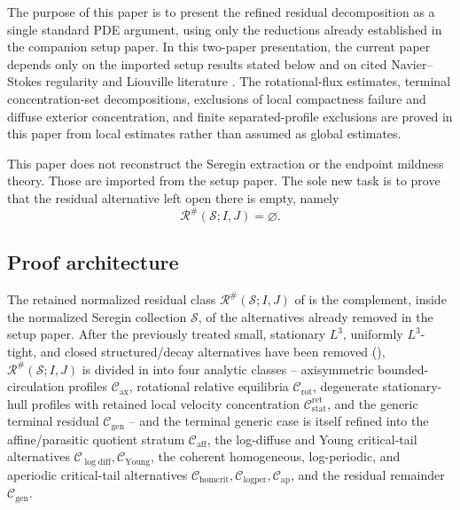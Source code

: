 \documentclass[11pt]{amsart}
\numberwithin{equation}{section}
\theoremstyle{plain}
\theoremstyle{definition}
\theoremstyle{remark}
\newcommand{\calS}{\mathcal S}
\newcommand{\calR}{\mathcal R}
\newcommand{\Cax}{\mathcal C_{\mathrm{ax}}}
\newcommand{\Crot}{\mathcal C_{\mathrm{rot}}}
\newcommand{\Cstat}{\mathcal C_{\mathrm{stat}}^{\mathrm{ret}}}
\newcommand{\Caff}{\mathcal C_{\mathrm{aff}}}
\newcommand{\Cgen}{\mathcal C_{\mathrm{gen}}}
\newcommand{\Chomcrit}{\mathcal C_{\mathrm{homcrit}}}
\newcommand{\Clogper}{\mathcal C_{\mathrm{logper}}}
\newcommand{\Capcrit}{\mathcal C_{\mathrm{ap}}}
\newcommand{\Cyoung}{\mathcal C_{\mathrm{Young}}}
\newcommand{\Clogdiff}{\mathcal C_{\log\mathrm{diff}}}
\begin{document}
The purpose of this paper is to present the refined residual decomposition as a
single standard PDE argument, using only the reductions already established in
the companion setup paper.  In this two-paper presentation, the current paper
depends only on the imported setup results stated below and on cited
Navier--Stokes regularity and Liouville literature
\cite{KNSS2009,Seregin2012}.  The
rotational-flux estimates, terminal concentration-set decompositions,
exclusions of local compactness failure and diffuse exterior concentration, and
finite separated-profile exclusions are proved in this paper from local
estimates rather than assumed as global estimates.

This paper does not reconstruct the Seregin extraction or the endpoint mildness
theory.  Those are imported from the setup paper.  The sole new task is to
prove that the residual alternative left open there is empty, namely
\[
   \calR^\#(\calS;I,J)=\varnothing .
\]

\subsection{Proof architecture}
\label{subsec:proof-architecture}
The retained normalized residual class \(\calR^\#(\calS;I,J)\) of
 is the complement, inside the normalized Seregin
collection \(\calS\), of the alternatives already removed in the setup paper.
After the previously treated small, stationary \(L^3\), uniformly
\(L^3\)-tight, and closed structured/decay alternatives have been removed
(), \(\calR^\#(\calS;I,J)\) is divided in
 into four analytic classes -- axisymmetric
bounded-circulation profiles \(\Cax\), rotational relative equilibria
\(\Crot\), degenerate stationary-hull profiles with retained local velocity
concentration \(\Cstat\), and the generic terminal residual \(\Cgen\) -- and
the terminal generic case is itself refined into the affine/parasitic quotient
stratum \(\Caff\), the log-diffuse and Young critical-tail alternatives
\(\Clogdiff,\Cyoung\), the coherent homogeneous, log-periodic, and aperiodic
critical-tail alternatives \(\Chomcrit,\Clogper,\Capcrit\), and the residual
remainder \(\Cgen\).
\end{document}

